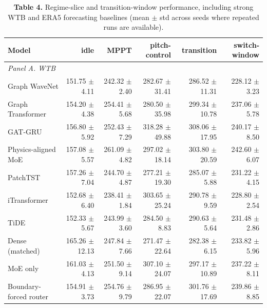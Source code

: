 \begin{table}[t]
\centering
\scriptsize
\setlength{\tabcolsep}{3pt}
\renewcommand{\arraystretch}{1.04}
\caption*{\textbf{Table 4.} Regime-slice and transition-window performance, including strong WTB and ERA5 forecasting baselines (mean $\pm$ std across seeds where repeated runs are available).}
\begin{tabular}{lrrrrr}
\toprule
Model & idle & MPPT & pitch-control & transition & switch-window \\
\midrule
\multicolumn{6}{l}{\textit{Panel A. WTB}} \\
Graph WaveNet & 151.75 $\pm$ 4.11 & 242.32 $\pm$ 2.40 & 282.67 $\pm$ 31.41 & 286.52 $\pm$ 11.31 & 228.12 $\pm$ 3.23 \\
Graph Transformer & 154.20 $\pm$ 4.38 & 254.41 $\pm$ 5.68 & 280.50 $\pm$ 35.98 & 299.34 $\pm$ 10.78 & 237.06 $\pm$ 5.78 \\
GAT-GRU & 156.80 $\pm$ 5.92 & 252.43 $\pm$ 7.29 & 318.28 $\pm$ 49.88 & 308.06 $\pm$ 17.95 & 240.17 $\pm$ 8.50 \\
Physics-aligned MoE & 157.08 $\pm$ 5.57 & 261.09 $\pm$ 4.82 & 297.02 $\pm$ 18.14 & 303.80 $\pm$ 20.59 & 242.60 $\pm$ 6.07 \\
PatchTST & 157.26 $\pm$ 7.04 & 244.70 $\pm$ 4.87 & 277.21 $\pm$ 19.30 & 285.07 $\pm$ 5.88 & 231.22 $\pm$ 4.15 \\
iTransformer & 152.68 $\pm$ 6.40 & 238.41 $\pm$ 1.84 & 303.65 $\pm$ 25.24 & 290.78 $\pm$ 9.59 & 228.80 $\pm$ 2.54 \\
TiDE & 152.33 $\pm$ 5.67 & 243.99 $\pm$ 3.60 & 284.50 $\pm$ 8.83 & 290.63 $\pm$ 5.64 & 231.48 $\pm$ 2.86 \\
Dense (matched) & 165.26 $\pm$ 12.13 & 247.84 $\pm$ 7.66 & 271.47 $\pm$ 22.64 & 282.38 $\pm$ 6.15 & 233.82 $\pm$ 5.96 \\
MoE only & 161.03 $\pm$ 4.13 & 251.50 $\pm$ 9.14 & 307.10 $\pm$ 24.07 & 297.17 $\pm$ 10.89 & 237.22 $\pm$ 8.11 \\
Boundary-forced router & 154.91 $\pm$ 3.73 & 254.76 $\pm$ 9.79 & 286.95 $\pm$ 22.07 & 301.76 $\pm$ 17.69 & 239.86 $\pm$ 8.85 \\
\bottomrule
\end{tabular}


\end{table}
